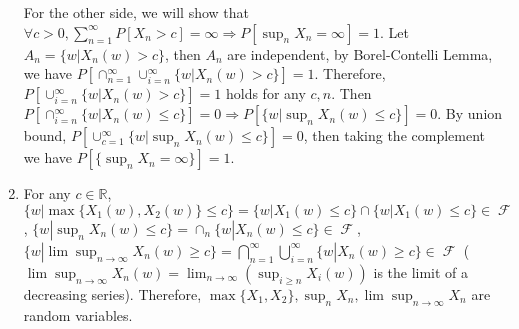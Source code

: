 \documentclass{article}
\DeclareMathOperator{\mF}{\mathcal{F}}
\begin{document}
\begin{enumerate}
    For the other side, we will show that
    $\forall c > 0, \sum_{n=1}^{\infty} P[X_n > c] = \infty \Rightarrow P[\sup_n X_n = \infty]=1$. Let $A_n = \{w|X_n(w) > c \}$,
    then $A_n$ are independent, 
    by Borel-Contelli Lemma, we have $P[\cap_{n=1}^{\infty} \cup_{i=n}^{\infty} \{w|X_n(w)>c\}]=1$. Therefore,
    $P[ \cup_{i=n}^{\infty} \{w|X_n(w)>c\}]=1$ holds for any $c,n$.
    Then $P[ \cap_{i=n}^{\infty} \{w|X_n(w)\leq c\}]=0 \Rightarrow
    P[ \{w|\sup_n X_n(w)\leq c\}]=0$. By union bound,
    $P[\cup_{c=1}^{\infty}\{w | \sup_n X_n(w) \leq c \}]=0$, then
    taking the complement we have
    $P[\{\sup_n X_n = \infty\}]=1$.
    
   \item For any $c \in \mathbb{R}$, $\{w| \max\{X_1(w), X_2(w)\} \leq c\}
       = \{w| X_1(w) \leq c\} \cap \{w| X_1(w) \leq c\} \in \mF$, 
       $\{w| \sup_n X_n(w) \leq c\}
       = \cap_{n} \{w| X_n(w) \leq c\} \in \mF$,
       $\{w| \lim\sup_{n\to \infty} X_n(w) \geq c\}
       = \bigcap_{n=1}^{\infty}\bigcup_{i=n}^{\infty} \{w| X_n(w) \geq c \} \in \mF$ ($\lim\sup_{n\to \infty} X_n(w)= \lim_{n\to \infty}(\sup_{i\geq n}X_i(w))$ is the limit of a decreasing series).
       Therefore, $\max\{X_1, X_2\}, \sup_{n} X_n, \lim\sup_{n\to \infty} X_n$ are random variables.
       
\end{enumerate}
\end{document}
